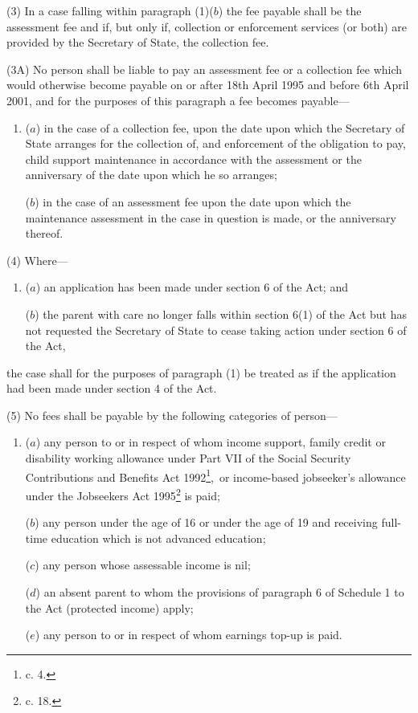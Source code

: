 \documentclass[12pt,a4paper]{article}
\begin{document}

(3) In a case falling within paragraph (1)($b$) the fee payable shall be the assessment fee and if, but only if, collection or enforcement services (or both) are provided by the Secretary of State, the collection fee.

(3A) No person shall be liable to pay an assessment fee or a collection fee which would otherwise become payable on or after 18th April 1995 and before 6th April 
2001,  %
and for the purposes of this paragraph a fee becomes payable—
\begin{enumerate}\item[]
($a$) in the case of a collection fee, upon the date upon which the Secretary of State arranges for the collection of, and enforcement of the obligation to pay, child support maintenance in accordance with the assessment or the anniversary of the date upon which he so arranges;

($b$) in the case of an assessment fee upon the date upon which the maintenance assessment in the case in question is made, or the anniversary thereof.
\end{enumerate}

(4) Where—
\begin{enumerate}\item[]
($a$) an application has been made under section 6 of the Act; and

($b$) the parent with care no longer falls within section 6(1) of the Act but has not requested the Secretary of State to cease taking action under section 6 of the Act,
\end{enumerate}
the case shall for the purposes of paragraph (1) be treated as if the application had been made under section 4 of the Act.

(5) No fees shall be payable by the following categories of person—
\begin{enumerate}\item[]
($a$) any person to or in respect of whom income support, family credit or disability working allowance under Part VII of the Social Security Contributions and Benefits Act 1992\footnote{ c. 4.},~or income-based jobseeker’s allowance under the Jobseekers Act 1995\footnote{ c. 18.} is paid;

($b$) any person under the age of 16 or under the age of 19 and receiving full-time education which is not advanced education;

($c$) any person whose assessable income is nil;

($d$) an absent parent to whom the provisions of paragraph 6 of Schedule 1 to the Act (protected income) apply;

($e$) any person to or in respect of whom earnings top-up is paid.
\end{enumerate}
\end{document}
